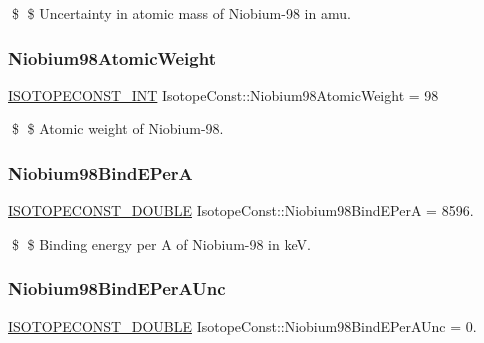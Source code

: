 \$ \$ Uncertainty in atomic mass of Niobium-\/98 in amu. \mbox{\label{group___isotope_const-_niobium-_nb98_gafd90812761cfbdab1731ce357356ecc6}} 
\subsubsection{\texorpdfstring{Niobium98\+Atomic\+Weight}{Niobium98AtomicWeight}}
{\footnotesize\ttfamily \mbox{\hyperlink{group___isotope_const-_macros_ga5f18360b3e99483a35c32d789e62621c}{I\+S\+O\+T\+O\+P\+E\+C\+O\+N\+S\+T\+\_\+\+I\+NT}} Isotope\+Const\+::\+Niobium98\+Atomic\+Weight = 98}

\$ \$ Atomic weight of Niobium-\/98. \mbox{\label{group___isotope_const-_niobium-_nb98_gaf7429abc9449e88f46cf392b54aca6d0}} 
\subsubsection{\texorpdfstring{Niobium98\+Bind\+E\+PerA}{Niobium98BindEPerA}}
{\footnotesize\ttfamily \mbox{\hyperlink{group___isotope_const-_macros_ga8f45a7272ce02c0b4c65c44636ed719a}{I\+S\+O\+T\+O\+P\+E\+C\+O\+N\+S\+T\+\_\+\+D\+O\+U\+B\+LE}} Isotope\+Const\+::\+Niobium98\+Bind\+E\+PerA = 8596.}

\$ \$ Binding energy per A of Niobium-\/98 in keV. \mbox{\label{group___isotope_const-_niobium-_nb98_ga859cd45f693b8c1874f234c41507411b}} 
\subsubsection{\texorpdfstring{Niobium98\+Bind\+E\+Per\+A\+Unc}{Niobium98BindEPerAUnc}}
{\footnotesize\ttfamily \mbox{\hyperlink{group___isotope_const-_macros_ga8f45a7272ce02c0b4c65c44636ed719a}{I\+S\+O\+T\+O\+P\+E\+C\+O\+N\+S\+T\+\_\+\+D\+O\+U\+B\+LE}} Isotope\+Const\+::\+Niobium98\+Bind\+E\+Per\+A\+Unc = 0.}

